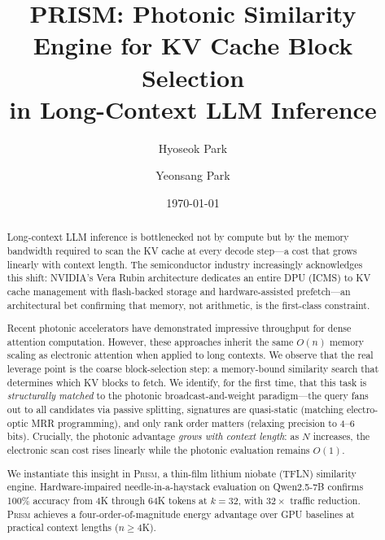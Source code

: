 \documentclass[pra,twocolumn,superscriptaddress,amsmath,amssymb,longbibliography,floatfix]{revtex4-2}
\newcommand{\prism}{\textsc{Prism}}
\begin{document}
\title{PRISM: Photonic Similarity Engine for KV Cache Block Selection\\in Long-Context LLM Inference}

\author{Hyoseok Park}

\author{Yeonsang Park}

\date{\today}

\begin{abstract}
Long-context LLM inference is bottlenecked not by compute
but by the memory bandwidth required to scan the KV cache
at every decode step---a cost that grows linearly with context
length.
The semiconductor industry increasingly acknowledges this shift:
NVIDIA's Vera Rubin architecture dedicates an entire DPU (ICMS)
to KV cache management with flash-backed storage and
hardware-assisted prefetch---an architectural bet confirming that
memory, not arithmetic, is the first-class
constraint.

Recent photonic accelerators have demonstrated impressive
throughput for dense attention
computation.
However, these approaches inherit the same $O(n)$ memory scaling
as electronic attention when applied to long contexts.
We observe that the real leverage point is the coarse
block-selection step: a memory-bound similarity search that
determines which KV blocks to fetch.
We identify, for the first time, that this task is
\emph{structurally matched} to the photonic broadcast-and-weight
paradigm---the query fans out to all candidates via passive
splitting, signatures are quasi-static (matching electro-optic
MRR programming), and only rank order matters (relaxing precision
to 4--6 bits).
Crucially, the photonic advantage \emph{grows with context
length}: as $N$ increases, the electronic scan cost rises
linearly while the photonic evaluation remains $O(1)$.

We instantiate this insight in \prism{}, a thin-film lithium
niobate (TFLN) similarity engine.
Hardware-impaired needle-in-a-haystack evaluation on Qwen2.5-7B
confirms 100\% accuracy from 4K through 64K tokens at $k{=}32$,
with $32\times$ traffic reduction.
\prism{} achieves a four-order-of-magnitude energy advantage
over GPU baselines at practical context lengths ($n \geq 4$K).
\end{abstract}
\end{document}
